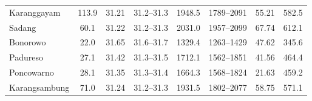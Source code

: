 {\begin{tabular}{lccccccc}
Ka\-rang\-ga\-yam & 113.9 & 31.21 & 31.2--31.3 & 1948.5 & 1789--2091 & 55.21 & 582.5 \\
Sadang & 60.1 & 31.22 & 31.2--31.3 & 2031.0 & 1957--2099 & 67.74 & 612.1 \\
Bonorowo & 22.0 & 31.65 & 31.6--31.7 & 1329.4 & 1263--1429 & 47.62 & 345.6 \\
Padureso & 27.1 & 31.42 & 31.3--31.5 & 1712.1 & 1562--1851 & 41.56 & 464.4 \\
Poncowarno & 28.1 & 31.35 & 31.3--31.4 & 1664.3 & 1568--1824 & 21.63 & 459.2 \\
Ka\-rang\-sam\-bung & 71.0 & 31.24 & 31.2--31.3 & 1931.5 & 1802--2077 & 58.75 & 571.1 \\
\hline\hline
\end{tabular}%
}
